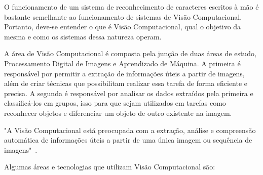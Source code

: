 \documentclass[12pt,oneside,a4paper,chapter=TITLE,section=TITLE,sumario
		=tradicional]{abntex2}
\begin{document}
		O funcionamento de um sistema de reconhecimento de caracteres escritos à mão é bastante semelhante ao funcionamento de sistemas de Visão Computacional. Portanto, deve-se entender o que é Visão Computacional, qual o objetivo da mesma e como os sistemas dessa natureza operam. 
			
		A área de Visão Computacional é composta pela junção de duas áreas de estudo, Processamento Digital de Imagens e Aprendizado de Máquina. A primeira é responsável por permitir a extração de informações úteis a partir de imagens, além de criar técnicas que possibilitam realizar essa tarefa de forma eficiente e precisa. A segunda é responsável por analisar os dados extraídos pela primeira e classificá-los em grupos, isso para que sejam utilizados em tarefas como reconhecer objetos e diferenciar um objeto de outro existente na imagem.
		
		\begin{citacao}
		"A Visão Computacional está preocupada com a extração, análise e compreensão automática de informações úteis a partir de uma única imagem ou sequência de imagens"~\cite{bmvacompvision}.
		\end{citacao}
		
		Algumas áreas e tecnologias que utilizam Visão Computacional são:
		
\end{document}
